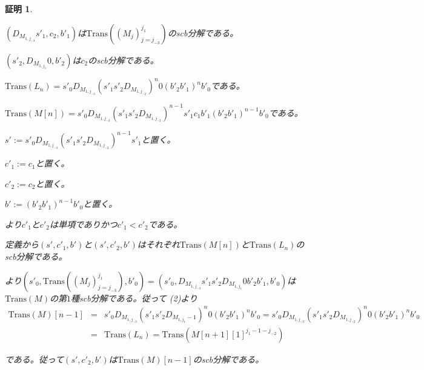 \documentclass[dvipdfmx,uplatex]{jsarticle}
\newif\iffull
\theoremstyle{customnonumberbreakfortheorem}
\theoremstyle{customnonumberbreakforproof}
\newtheorem{hideableproof}{証明}
\newcommand{\qedhere}{\hfill\hideableproofSymbol}
\begin{document}
\begin{hideableproof}
\begin{indented}
\begin{penumerate}
			\item \((D_{M_{1,j_{-3}}} s'_1,c_2,b'_1)\)は\(\textrm{Trans}((M_j)_{j=j_{-3}}^{j_1})\)のscb分解である。
			\item \((s'_2,D_{M_{1,j_1}} 0,b'_2)\)は\(c_2\)のscb分解である。
			\setcounter{penumeratei}{4}
			\item \(\textrm{Trans}(L_n) = s'_0 D_{M_{1,j_{-3}}} (s'_1 s'_2 D_{M_{1,j_{-2}}})^n 0 (b'_2 b'_1)^n b'_0\)である。
			\item \(\textrm{Trans}(M[n]) = s'_0 D_{M_{1,j_{-3}}} (s'_1 s'_2 D_{M_{1,j_{-2}}})^{n-1} s'_1 c_1 b'_1 (b'_2 b'_1)^{n-1} b'_0\)である。
			\item[] \(s' := s'_0 D_{M_{1,j_{-3}}} (s'_1 s'_2 D_{M_{1,j_{-2}}})^{n-1} s'_1\)と置く。
			\item[] \(c'_1 := c_1\)と置く。
			\item[] \(c'_2 := c_2\)と置く。
			\item[] \(b' := (b'_2 b'_1)^{n-1} b'_0\)と置く。
			\item[] より\(c'_1\)と\(c'_2\)は単項でありかつ\(c'_1 < c'_2\)である。
			\item[] 定義から\((s',c'_1,b')\)と\((s',c'_2,b')\)はそれぞれ\(\textrm{Trans}(M[n])\)と\(\textrm{Trans}(L_n)\)のscb分解である。
			\item[] より\((s'_0,\textrm{Trans}((M_j)_{j=j_{-3}}^{j_1}),b'_0) = (s'_0,D_{M_{1,j_{-3}}} s'_1 s'_2 D_{M_{1,j_1}} 0 b'_2 b'_1,b'_0)\)は\(\textrm{Trans}(M)\)の第\(1\)種scb分解である。従って (2)より
			\begin{eqnarray*}
			\textrm{Trans}(M)[n-1] & = & s'_0 D_{M_{1,j_{-3}}} (s'_1 s'_2 D_{M_{1,j_1}-1})^n 0 (b'_2 b'_1)^n b'_0 = s'_0 D_{M_{1,j_{-3}}} (s'_1 s'_2 D_{M_{1,j_{-2}}})^n 0 (b'_2 b'_1)^n b'_0\\
			& = & \textrm{Trans}(L_n) = \textrm{Trans}(M[n+1][1]^{j_1-1-j_{-2}})
			\end{eqnarray*}
			\item[] である。従って\((s',c'_2,b')\)は\(\textrm{Trans}(M)[n-1]\)のscb分解である。 \qedhere\NoEndMark
		\end{penumerate}
	\end{indented}
\end{hideableproof}

\iffull{それでは本題に戻る。}\fi
\end{document}

